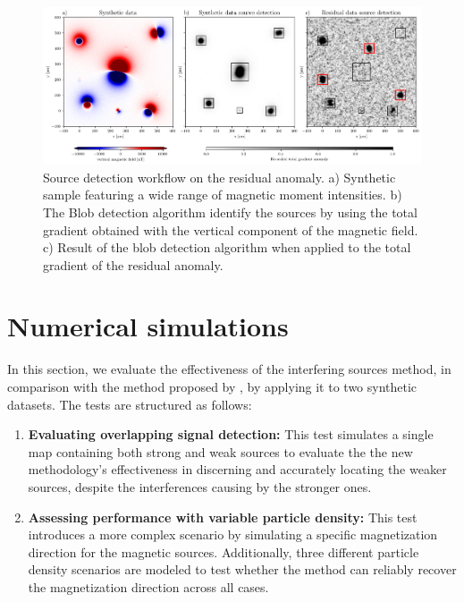     \begin{figure}[tb!]
      \centering
      \includegraphics[width=1\linewidth]{micromag-interfering-sources/figures/re-detection-methodology.png}
      \caption{Source detection workflow on the residual anomaly. a) Synthetic sample featuring a wide range of magnetic moment intensities. b) The Blob detection algorithm identify the sources by using the total gradient obtained with the vertical component of the magnetic field. c) Result of the blob detection algorithm when applied to the total gradient of the residual anomaly.}
      \label{method-redetection}
    \end{figure}

\section{Numerical simulations}

In this section, we evaluate the effectiveness of the interfering sources method, in comparison with the method proposed by \citet{Souza-Junior2024}, by applying it to two synthetic datasets. The tests are structured as follows:

\begin{enumerate}
    \item \textbf{Evaluating overlapping signal detection:} This test simulates a single map containing both strong and weak sources to evaluate the the new methodology's effectiveness in discerning and accurately locating the weaker sources, despite the interferences causing by the stronger ones.

    \item \textbf{Assessing performance with variable particle density:} This test introduces a more complex scenario by simulating a specific magnetization direction for the magnetic sources. Additionally, three different particle density scenarios are modeled to test whether the method can reliably recover the magnetization direction across all cases.

\end{enumerate}

